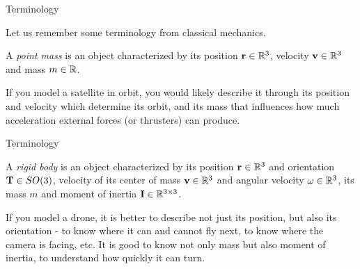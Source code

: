 \documentclass{beamer}
\begin{document}
\begin{frame}{Terminology}
\begin{flushleft}

Let us remember some terminology from classical mechanics.

\bigskip

A \emph{point mass} is an object characterized by its position $\mathbf{r} \in \mathbb{R}^3$, velocity $\mathbf{v} \in \mathbb{R}^3$ and mass $m \in \mathbb{R}$.

\bigskip

\begin{example}
	If you model a satellite in orbit, you would likely describe it through its position and velocity which determine its orbit, and its mass that influences how much acceleration external forces (or thrusters) can produce.
\end{example}

\end{flushleft}
\end{frame}



\begin{frame}{Terminology}
	\begin{flushleft}
		
		
		A \emph{rigid body} is an object characterized by its position $\mathbf{r} \in \mathbb{R}^3$ and orientation $\mathbf{T} \in SO(3)$, velocity of its center of mass $\mathbf{v} \in \mathbb{R}^3$ and angular velocity $\omega \in \mathbb{R}^3$, its mass $m$ and moment of inertia $\mathbf{I} \in \mathbb{R}^{3 \times 3}$.
		
		\bigskip
		
		\begin{example}
			If you model a drone, it is better to describe not just its position, but also its orientation - to know where it can and cannot fly next, to know where the camera is facing, etc. It is good to know not only mass but also moment of inertia, to understand how quickly it can turn.
		\end{example}
		
	\end{flushleft}
\end{frame}
\end{document}
